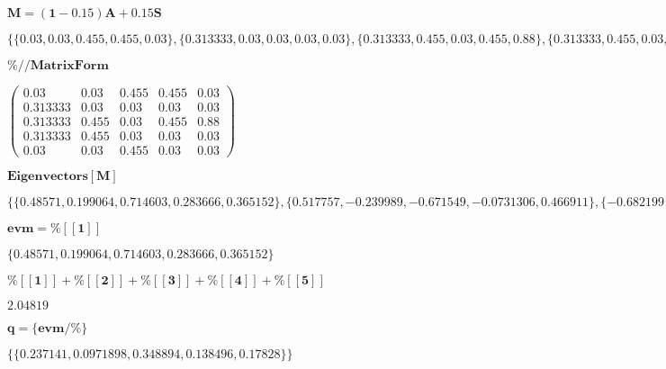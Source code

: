 \documentclass{article}
\begin{document}
\noindent\(\pmb{M=(1-0.15)A+0.15S}\)

\noindent\(\{\{0.03,0.03,0.455,0.455,0.03\},\{0.313333,0.03,0.03,0.03,0.03\},\{0.313333,0.455,0.03,0.455,0.88\},\{0.313333,0.455,0.03,0.03,0.03\},\{0.03,0.03,0.455,0.03,0.03\}\}\)

\noindent\(\pmb{\%\text{//}\text{MatrixForm}}\)

\noindent\(\left(
\begin{array}{ccccc}
 0.03 & 0.03 & 0.455 & 0.455 & 0.03 \\
 0.313333 & 0.03 & 0.03 & 0.03 & 0.03 \\
 0.313333 & 0.455 & 0.03 & 0.455 & 0.88 \\
 0.313333 & 0.455 & 0.03 & 0.03 & 0.03 \\
 0.03 & 0.03 & 0.455 & 0.03 & 0.03
\end{array}
\right)\)

\noindent\(\pmb{\text{Eigenvectors}[M]}\)

\noindent\(\{\{0.48571,0.199064,0.714603,0.283666,0.365152\},\{0.517757,-0.239989,-0.671549,-0.0731306,0.466911\},\{-0.682199+0. i,0.407353+0.366382
i,0.0833974-0.0887608 i,0.33765-0.289938 i,-0.146202+0.0123168 i\},\{-0.682199+0. i,0.407353-0.366382 i,0.0833974+0.0887608 i,0.33765+0.289938 i,-0.146202-0.0123168
i\},\{-0.233368,-0.231287,0.418149,-0.575126,0.621633\}\}\)

\noindent\(\pmb{\text{evm}=\%[[1]]}\)

\noindent\(\{0.48571,0.199064,0.714603,0.283666,0.365152\}\)

\noindent\(\pmb{\%[[1]]+\%[[2]]+\%[[3]]+\%[[4]]+\%[[5]]}\)

\noindent\(2.04819\)

\noindent\(\pmb{q=\{\text{evm}/\%\}}\)

\noindent\(\{\{0.237141,0.0971898,0.348894,0.138496,0.17828\}\}\)
\end{document}
